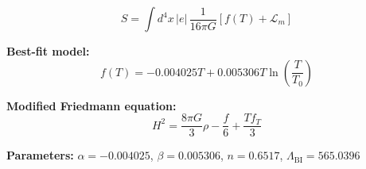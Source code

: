 
\begin{equation}
  S = \int d^4x \, |e| \, \frac{1}{16\pi G} \left[ f(T) + \mathcal{L}_m \right]
\end{equation}

\textbf{Best-fit model:}
\begin{equation}
  f(T) = -0.004025 T + 0.005306 T \ln\!\left(\frac{T}{T_0}\right)
\end{equation}

\textbf{Modified Friedmann equation:}
\begin{equation}
  H^2 = \frac{8\pi G}{3} \rho - \frac{f}{6} + \frac{T f_T}{3}
\end{equation}

\textbf{Parameters:}
$\alpha = -0.004025$, \quad
$\beta = 0.005306$, \quad
$n = 0.6517$, \quad
$\Lambda_{\text{BI}} = 565.0396$